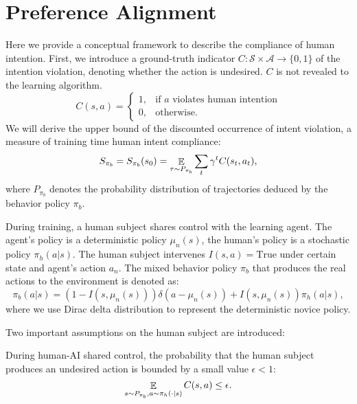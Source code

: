 \section{Preference Alignment}
\label{section:appendix-proof}

Here we provide a conceptual framework to describe the compliance of human intention.
First, we introduce a ground-truth indicator $C: \mathcal S\times \mathcal A \to \{0, 1\}$ of the intention violation, denoting whether the action is undesired. $C$ is not revealed to the learning algorithm.
\begin{equation}
C(s, a) = 
\begin{cases}
  1, & \text{if } a  \text{ violates human intention} 
  \\
  0, & \text{otherwise.}
\end{cases}
\end{equation}
We will derive the upper bound of the discounted occurrence of intent violation, a measure of training time human intent compliance:
\begin{equation}
S_{\pi_b} = S_{\pi_b}(s_0) = \mathop{\mathbb E}_{\tau\sim P_{\pi_b}} \sum_{t}\gamma^{t} C(s_{t}, a_{t}),
\end{equation}
where $P_{\pi_b}$ denotes the probability distribution of trajectories deduced by the behavior policy $\pi_b$.

 

During training, a human subject shares control with the learning agent. 
The agent's policy is a deterministic policy $\mu_n(s)$, the human's policy is a stochastic policy $\pi_h(a|s)$.
The human subject intervenes $I(s, a) = \text{True}$ under certain state and agent's action $a_n$.
The mixed behavior policy $\pi_b$ that produces the real actions to the environment is denoted as:
\begin{equation}
\label{equation:behavior-policy-with-deterministic-novice}
  \pi_b(a|s) 
  = 
  (1 - I(s, \mu_n(s)))\delta(a - \mu_n(s))
  + 
  I(s, \mu_n(s)){\pi_h}(a|s),
\end{equation}
where we use Dirac delta distribution to represent the deterministic novice policy.



{
Two important assumptions on the human subject are introduced:
}
\begin{assumption}
\label{assumption:human-policy-error-rate}
During human-AI shared control, the probability that the human subject produces an undesired action is bounded by a small value $\epsilon < 1$:
\begin{equation}
	\mathop{\mathbb E}_{s \sim P_{\pi_b}, a\sim {\pi_h}(\cdot|s)} C(s, a) \le \epsilon  .
\end{equation}
\end{assumption}


